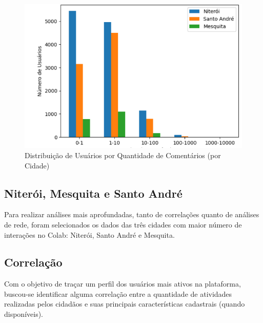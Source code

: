 \begin{figure}[!htb]
	\caption{Distribuição de Usuários por Quantidade de Comentários (por Cidade)}
	\label{fig:colab_comments_by_city}
	\centering
	\includegraphics[scale=0.8]{images/colab_comments_by_city.png}
\end{figure}

\subsection*{Niterói, Mesquita e Santo André}

Para realizar análises mais aprofundadas, tanto de correlações quanto de análises de rede, foram selecionados os dados das três cidades com maior número de interações no Colab: Niterói, Santo André e Mesquita.

\subsection*{Correlação}

Com o objetivo de traçar um perfil dos usuários mais ativos na plataforma, buscou-se identificar alguma correlação entre a quantidade de atividades realizadas pelos cidadãos e suas principais características cadastrais (quando disponíveis). 

